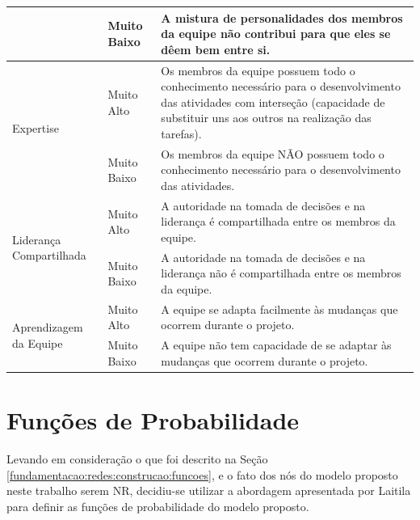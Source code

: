 \begin{center}
\begin{longtable}{
|p{0.30\dimexpr \textwidth-3\arrayrulewidth-3\tabcolsep\relax}|
 p{0.08\dimexpr \textwidth-3\arrayrulewidth-3\tabcolsep\relax}|
 p{0.62\dimexpr \textwidth-3\arrayrulewidth-3\tabcolsep\relax}|
}
                                              & Muito Baixo & A mistura de personalidades dos membros da equipe não contribui para que eles se dêem bem entre si.                                                                                   \\ \hline
\multirow{2}{*}{Expertise}                    & Muito Alto  & Os membros da equipe possuem todo o conhecimento necessário para o desenvolvimento das atividades com interseção (capacidade de substituir uns aos outros na realização das tarefas). \\ \cline{2-3}
                                              & Muito Baixo & Os membros da equipe NÃO possuem todo o conhecimento necessário para o desenvolvimento das atividades.                                                                                \\ \hline
\multirow{2}{*}{Liderança Compartilhada}      & Muito Alto  & A autoridade na tomada de decisões e na liderança é compartilhada entre os membros da equipe.                                                                                         \\ \cline{2-3}
                                              & Muito Baixo & A autoridade na tomada de decisões e na liderança não é compartilhada entre os membros da equipe.                                                                                     \\ \hline
\multirow{2}{*}{Aprendizagem da Equipe}       & Muito Alto  & A equipe se adapta facilmente às mudanças que ocorrem durante o projeto.                                                                                                              \\ \cline{2-3}
                                              & Muito Baixo & A equipe não tem capacidade de se adaptar às mudanças que ocorrem durante o projeto.                                                                                                  \\ \hline


\end{longtable}
\end{center} 

\section{Funções de Probabilidade}
\label{modelo:funcoes}

Levando em consideração o que foi descrito na Seção \ref{fundamentacao:redes:construcao:funcoes}, e o fato dos nós do modelo proposto neste trabalho serem NR, decidiu-se utilizar a abordagem apresentada por Laitila \cite{laitila} para definir as funções de probabilidade do modelo proposto.

